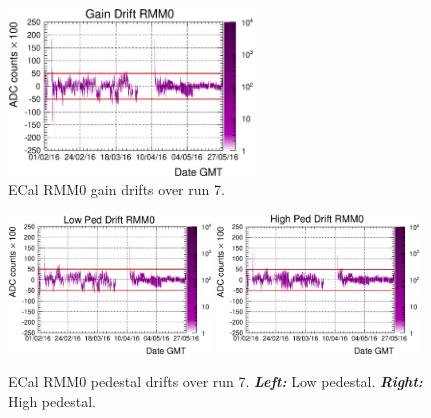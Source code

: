 \begin{figure}[ht]
  \begin{adjustbox}{center}
    \includegraphics[width=0.58\textwidth]{images/DataQuality/gaindrift.eps}
  \end{adjustbox}
  \caption[Run 7 ECal RMM0 gain drifts]{\Gls{ECal} \Gls{RMM}0 gain
    drifts over run 7.}
  \label{fig:gain}
\end{figure}


\begin{figure}[ht]
  \begin{adjustbox}{center}
    \includegraphics[width=0.48\textwidth]{images/DataQuality/lowped.eps} 
    \includegraphics[width=0.48\textwidth]{images/DataQuality/highped.eps}
  \end{adjustbox}
  \caption[Run 7 ECal pedestal drifts]{\Gls{ECal} \Gls{RMM}0 pedestal
    drifts over run 7. \textbf{\textit{Left:}} Low
    pedestal. \textbf{\textit{Right:}} High pedestal.}
  \label{fig:ped}
\end{figure}


